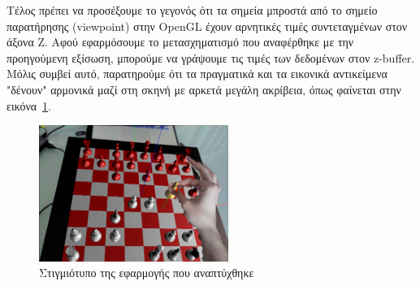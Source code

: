 Τέλος πρέπει να προσέξουμε το γεγονός ότι τα σημεία μπροστά από το σημείο παρατήρησης (viewpoint) στην OpenGL έχουν αρνητικές τιμές συντεταγμένων στον άξονα Z. Αφού εφαρμόσουμε το μετασχηματισμό που αναφέρθηκε με την προηγούμενη εξίσωση, μπορούμε να γράψουμε τις τιμές των δεδομένων στον z-buffer. Μόλις συμβεί αυτό, παρατηρούμε ότι τα πραγματικά και τα εικονικά αντικείμενα "δένουν" αρμονικά μαζί στη σκηνή με αρκετά μεγάλη ακρίβεια, όπως φαίνεται στην εικόνα~\ref{fig:occlusion}.



\begin{figure}[H]
    \centering
    \includegraphics[width=0.55\textwidth]{Files/Figures/correct.pdf}
    \caption[Στιγμιότυπο της εφαρμογής που αναπτύχθηκε]{Στιγμιότυπο της εφαρμογής που αναπτύχθηκε}
    \label{fig:occlusion}
\end{figure}











